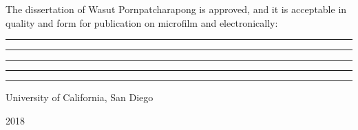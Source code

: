 \newpage
\thispagestyle{plain}


\doublespacing

\vspace*{\fill}

\noindent The dissertation of Wasut Pornpatcharapong is approved, and it is acceptable in quality and form
for publication on microfilm and electronically:

\vspace{0.35cm}

\par\noindent\rule{\textwidth}{0.5pt}

\vspace{0.35cm}

\par\noindent\rule{\textwidth}{0.5pt}

\vspace{0.35cm}

\par\noindent\rule{\textwidth}{0.5pt}

\vspace{0.35cm}

\par\noindent\rule{\textwidth}{0.5pt}

\vspace{0.35cm}

\par\noindent\rule{\textwidth}{0.5pt}


\begin{center}
    University of California, San Diego
 
    2018
\end{center}

\vspace*{\fill}
